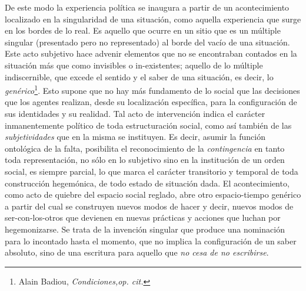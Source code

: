 \documentclass{book}
\begin{document}
De este modo la experiencia política se inaugura a partir de un
acontecimiento localizado en la singularidad de una situación, como
aquella experiencia que surge en los bordes de lo real. Es aquello que
ocurre en un sitio que es un múltiple singular (presentado pero no
representado) al borde del vacío de una situación. Este acto subjetivo
hace advenir elementos que no se encontraban contados en la situación
más que como invisibles o in-existentes; aquello de lo múltiple
indiscernible, que excede el sentido y el saber de una situación, es
decir, lo \emph{genérico}\footnote{Alain Badiou, \emph{Condiciones,op.
  cit.}}. Esto supone que no hay más fundamento de lo social que las
decisiones que los agentes realizan, desde su localización específica,
para la configuración de sus identidades y su realidad. Tal acto de
intervención indica el carácter inmanentemente político de toda
estructuración social, como así también de las \emph{subjetividades} que
en la misma se instituyen. Es decir, asumir la función ontológica de la
falta, posibilita el reconocimiento de la \emph{contingencia} en tanto
toda representación, no sólo en lo subjetivo sino en la institución de
un orden social, es siempre parcial, lo que marca el carácter
transitorio y temporal de toda construcción hegemónica, de todo estado
de situación dada. El acontecimiento, como acto de quiebre del espacio
social reglado, abre otro espacio-tiempo genérico a partir del cual se
construyen nuevos modos de hacer y decir, nuevos modos de
ser-con-los-otros que devienen en nuevas prácticas y acciones que luchan
por hegemonizarse. Se trata de la invención singular que produce una
nominación para lo incontado hasta el momento, que no implica la
configuración de un saber absoluto, sino de una escritura para aquello
que \emph{no cesa de no escribirse}.
\end{document}

